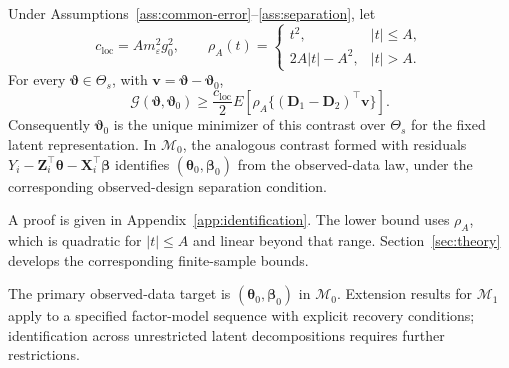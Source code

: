 \begin{proposition}
\label{prop:identification}
Under Assumptions~\ref{ass:common-error}--\ref{ass:separation}, let
\[
 c_{\mathrm{loc}}=A m_\varepsilon^2g_0^2,\qquad
 \rho_A(t)=
 \begin{cases}
 t^2,&|t|\le A,\\
 2A|t|-A^2,&|t|>A.
 \end{cases}
\]
For every $\bm{\vartheta}\in\Theta_s$, with $\bm{v}=\bm{\vartheta}-\bm{\vartheta}_0$,
\begin{equation}
 \mathcal G(\bm{\vartheta},\bm{\vartheta}_0)
 \ge \frac{c_{\mathrm{loc}}}{2}
 E\!\left[\rho_A\{(\bm{D}_1-\bm{D}_2)^\top \bm{v}\}\right].
 \label{eq:population-gap}
\end{equation}
Consequently $\bm{\vartheta}_0$ is the unique minimizer of this contrast over $\Theta_s$ for the fixed latent representation. In $\mathcal M_0$, the analogous contrast formed with residuals $Y_i-\bm{Z}_i^\top\bm{\theta}-\bm{X}_i^\top\bm{\beta}$ identifies $(\bm{\theta}_0,\bm{\beta}_0)$ from the observed-data law, under the corresponding observed-design separation condition.
\end{proposition}

A proof is given in Appendix~\ref{app:identification}. The lower bound uses $\rho_A$, which is quadratic for $|t|\le A$ and linear beyond that range. Section~\ref{sec:theory} develops the corresponding finite-sample bounds.

The primary observed-data target is $(\bm{\theta}_0,\bm{\beta}_0)$ in $\mathcal M_0$. Extension results for $\mathcal M_1$ apply to a specified factor-model sequence with explicit recovery conditions; identification across unrestricted latent decompositions requires further restrictions.

